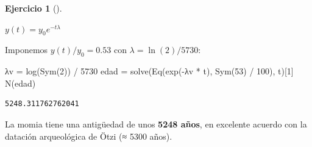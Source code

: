 \documentclass[
  spanish,
  a4paper,
]{scrreport}
\newenvironment{Shaded}{\begin{snugshade}}{\end{snugshade}}
\newcommand{\FloatTok}[1]{\textcolor[rgb]{0.68,0.00,0.00}{#1}}
\newcommand{\FunctionTok}[1]{\textcolor[rgb]{0.28,0.35,0.67}{#1}}
\newcommand{\NormalTok}[1]{\textcolor[rgb]{0.00,0.23,0.31}{#1}}
\newcommand{\OperatorTok}[1]{\textcolor[rgb]{0.37,0.37,0.37}{#1}}
\theoremstyle{definition}
\newtheorem{exercise}{Ejercicio}[chapter]
\theoremstyle{remark}
\begin{document}
\begin{exercise}[]
\begin{tcolorbox}
$y{\left(t \right)} = y_{0} e^{- t λ}$

Imponemos \(y(t)/y_0 = 0.53\) con \(\lambda = \ln(2)/5730\):

\begin{Shaded}
\begin{Highlighting}[]
\NormalTok{λv }\OperatorTok{=} \FunctionTok{log}\NormalTok{(}\FunctionTok{Sym}\NormalTok{(}\FloatTok{2}\NormalTok{)) }\OperatorTok{/} \FloatTok{5730}
\NormalTok{edad }\OperatorTok{=} \FunctionTok{solve}\NormalTok{(}\FunctionTok{Eq}\NormalTok{(}\FunctionTok{exp}\NormalTok{(}\OperatorTok{{-}}\NormalTok{λv }\OperatorTok{*}\NormalTok{ t), }\FunctionTok{Sym}\NormalTok{(}\FloatTok{53}\NormalTok{) }\OperatorTok{/} \FloatTok{100}\NormalTok{), t)[}\FloatTok{1}\NormalTok{]}
\FunctionTok{N}\NormalTok{(edad)}
\end{Highlighting}
\end{Shaded}

\begin{verbatim}
5248.311762762041
\end{verbatim}

La momia tiene una antigüedad de unos \textbf{5248 años}, en excelente
acuerdo con la datación arqueológica de Ötzi (≈ 5300 años).

\end{tcolorbox}

\end{exercise}
\end{document}
